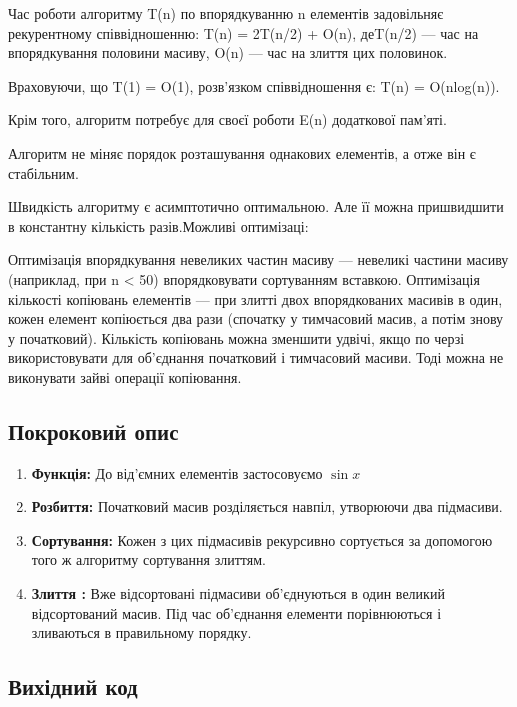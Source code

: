 \documentclass[12pt]{extarticle}
\begin{document}
Час роботи алгоритму T(n) по впорядкуванню n елементів задовільняє рекурентному співвідношенню: T(n) = 2T(n/2) + O(n), деT(n/2) — час на впорядкування половини масиву, O(n) — час на злиття цих половинок.

Враховуючи, що T(1) = O(1), розв’язком співвідношення є: T(n) = O(nlog(n)).

Крім того, алгоритм потребує для своєї роботи E(n) додаткової пам’яті.

Алгоритм не міняє порядок розташування однакових елементів, а отже він є стабільним.

Швидкість алгоритму є асимптотично оптимальною. Але її можна пришвидшити в константну кількість разів.Можливі оптимізаці:

Оптимізація впорядкування невеликих частин масиву — невеликі частини масиву (наприклад, при n < 50) впорядковувати сортуванням вставкою.
Оптимізація кількості копіювань елементів — при злитті двох впорядкованих масивів в один, кожен елемент копіюється два рази (спочатку у тимчасовий масив, а потім знову у початковий). Кількість копіювань можна зменшити удвічі, якщо по черзі використовувати для об’єднання початковий і тимчасовий масиви. Тоді можна не виконувати зайві операції копіювання.
\subsection*{Покроковий опис}

\begin{enumerate}
\item \textbf{Функція:} До від'ємних елементів застосовуємо $\sin x$ 

\item \textbf{Розбиття:} Початковий масив 
розділяється навпіл, утворюючи два підмасиви.
\item \textbf{Сортування:} Кожен з цих підмасивів 
рекурсивно сортується за допомогою того ж алгоритму сортування злиттям.
\item \textbf{Злиття :} Вже відсортовані підмасиви
 об'єднуються в один великий відсортований масив. Під час об'єднання елементи порівнюються і зливаються в правильному порядку.

\end{enumerate}

\subsection*{Вихідний код}
\end{document}

